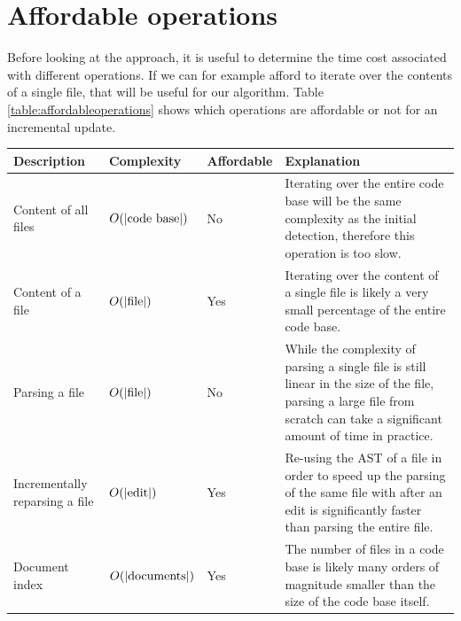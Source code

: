 \section{Affordable operations}

Before looking at the approach, it is useful to determine the time cost associated with
different operations. If we can for example afford to iterate over the contents of a
single file, that will be useful for our algorithm. Table \ref{table:affordableoperations}
shows which operations are affordable or not for an incremental update.

\begin{table}[t!]
	\begin{center}
		\begin{tabular}{|p{1in} | p{1in} | p{0.6in} | p{2.5in}|}
			\hline

			Description                    & Complexity              & Affordable & Explanation                               \\\hline

			Content of all files           & $O(|\Var{code\ base}|)$ & No         & Iterating over the
			entire code base will be the same complexity as the initial detection,
			therefore this operation is too slow.                                                                             \\\hline

			Content of a file              & $O(|\mathrm{file}|)$       & Yes        & Iterating over the content
			of a single file is likely a very small percentage of the entire code
			base.                                                                                                             \\\hline

			Parsing a file                 & $O(|\mathrm{file}|)$       & No         & While the complexity of
			parsing a single file is still linear in the size of the file, parsing a large
			file from scratch can take a significant amount of time in practice.                                              \\\hline

			Incrementally reparsing a file & $O(|\mathrm{edit}|)$       & Yes        & Re-using the
			AST of a file in order to speed up the parsing of the same file with
			after an edit is significantly faster than parsing the entire file.                                               \\\hline

			Document index                 & $O(|\mathrm{documents}|)$  & Yes        & The number of files in a code
			base is likely many orders of magnitude smaller than the size of the code base
			itself.                                                                                                           \\\hline


\end{tabular}
\end{center}
\end{table}
